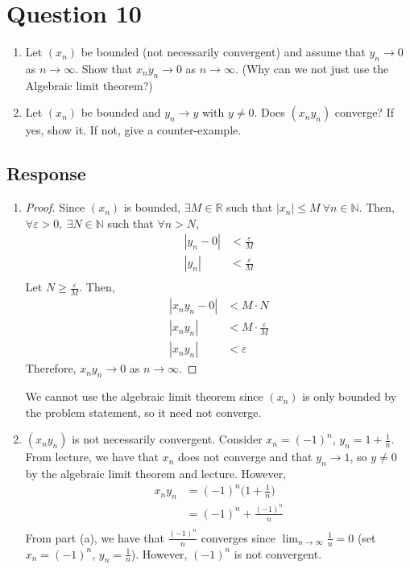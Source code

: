 \documentclass[13pt]{article}
\begin{document}
\newpage
\section*{Question 10}
\begin{enumerate}[label=(\alph*)]
\item Let $(x_n)$ be bounded (not necessarily convergent) and assume that
  $y_n \rightarrow 0$ as $n \rightarrow \infty$. Show that $x_ny_n
  \rightarrow 0 $ as $n \rightarrow \infty$. (Why can we not just use
  the Algebraic limit theorem?)
\item Let $(x_n)$ be bounded and $y_n \rightarrow y$ with $y \neq
  0$. Does $(x_ny_n)$ converge? If yes, show it. If not, give a counter-example.
\end{enumerate}

\subsection*{Response}
\begin{enumerate}[label=(\alph*)]
\item
  \begin{proof}
    Since $(x_n)$ is bounded, $\exists M \in \mathbb{R}$ such that
    $|x_n| \leq M \ \forall n \in \mathbb{N}$. Then, $\forall \varepsilon > 0, \
    \exists N \in \mathbb{N}$ such that $\forall n > N$,
    \begin{align*}
      |y_n - 0| &< \frac{\varepsilon}{M} \\
      |y_n| &< \frac{\varepsilon}{M} \\
    \end{align*}
    Let $N \geq \frac{\varepsilon}{M}$. Then,
    \begin{align*}
      |x_ny_n - 0| &< M \cdot N \\
      |x_ny_n| &< M \cdot \frac{\varepsilon}{M} \\
      |x_ny_n| &< \varepsilon
    \end{align*}
    Therefore, $x_ny_n \rightarrow 0$ as $n
    \rightarrow \infty$.
  \end{proof}
  We cannot use the algebraic limit theorem since $(x_n)$ is only bounded
  by the problem statement, so it need not converge.
  
\item $(x_ny_n)$ is not necessarily convergent. Consider $x_n =
  (-1)^n$, $y_n = 1 + \frac{1}{n}$. From lecture, we have that $x_n$
  does not converge and that $y_n \rightarrow 1$, so $y \neq 0$ by the algebraic
  limit theorem and lecture. However,
  \begin{align*}
    x_ny_n &= (-1)^n\bigg(1 + \frac{1}{n}\bigg) \\
           &= (-1)^n + \frac{(-1)^n}{n} \\
  \end{align*}
  From part (a), we have that $\frac{(-1)^n}{n}$ converges since
  $\lim_{n \rightarrow \infty} \frac{1}{n} = 0$ (set $x_n = (-1)^n$, $y_n = \frac{1}{n}$). However, $(-1)^n$ is
  not convergent.
\end{enumerate}
\end{document}
